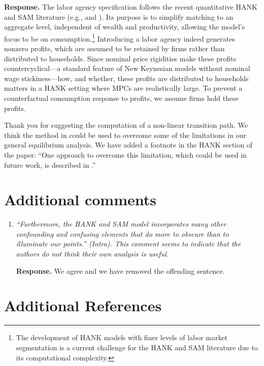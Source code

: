 \documentclass[12pt,letterpaper,english]{article}
\begin{document}
\begin{enumerate}[label=(\alph*)]
	\noindent \textbf{Response.} The labor agency specification follows the recent quantitative HANK and SAM literature (e.g., \cite{gravesUnemployment} and \cite{Gornemann2021}). Its purpose is to simplify matching to an aggregate level, independent of wealth and productivity, allowing the model's focus to be on consumption.\footnote{The development of HANK models with finer levels of labor market segmentation is a current challenge for the HANK and SAM literature due to its computational complexity.} Introducing a labor agency indeed generates nonzero profits, which are assumed to be retained by firms rather than distributed to households. Since nominal price rigidities make these profits countercyclical—a standard feature of New Keynesian models without nominal wage stickiness—how, and whether, these profits are distributed to households matters in a HANK setting where MPCs are realistically large. To prevent a counterfactual consumption response to profits, we assume firms hold these profits.
		
	Thank you for suggesting the computation of a non-linear transition path. We think the method in \citet{bmpMITshocks} could be used to overcome some of the limitations in our general equilibrium analysis. We have added a footnote in the HANK section of the paper: ``One approach to overcome this limitation, which could be used in future work, is described in \cite{bmpMITshocks}.''
\end{enumerate}

\bigskip
\newpage

\section*{Additional comments}

	\begin{enumerate}[label=(\alph*)]
		\item \textit{``Furthermore, the HANK and SAM model incorporates many other confounding and confusing elements that do more to obscure than to illuminate our points.'' (Intro). This comment seems to indicate that the authors do not think their own analysis is useful.}
		
		\noindent \textbf{Response.} We agree and we have removed the offending sentence.
	\end{enumerate}

\bigskip

\section*{Additional References}
	
\end{document}
